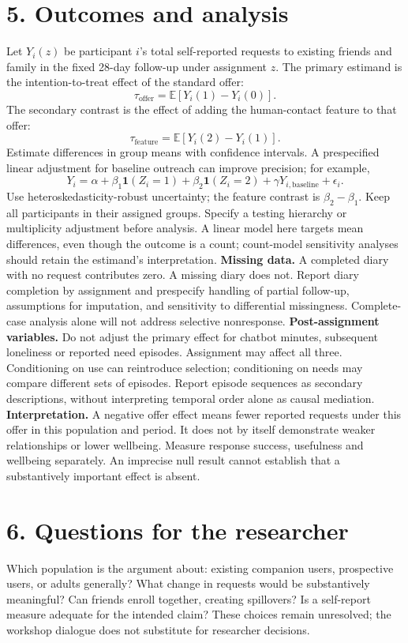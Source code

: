 \documentclass[11pt]{article}
\begin{document}
\section*{5. Outcomes and analysis}
Let $Y_i(z)$ be participant $i$'s total self-reported requests to existing friends and family in the fixed 28-day follow-up under assignment $z$. The primary estimand is the intention-to-treat effect of the standard offer:
\[
\tau_{\mathrm{offer}}=\mathbb{E}[Y_i(1)-Y_i(0)].
\]
The secondary contrast is the effect of adding the human-contact feature to that offer:
\[
\tau_{\mathrm{feature}}=\mathbb{E}[Y_i(2)-Y_i(1)].
\]
Estimate differences in group means with confidence intervals. A prespecified linear adjustment for baseline outreach can improve precision; for example,
\[
Y_i=\alpha+\beta_1\mathbf{1}(Z_i=1)+\beta_2\mathbf{1}(Z_i=2)+\gamma Y_{i,\mathrm{baseline}}+\epsilon_i.
\]
Use heteroskedasticity-robust uncertainty; the feature contrast is $\beta_2-\beta_1$. Keep all participants in their assigned groups. Specify a testing hierarchy or multiplicity adjustment before analysis. A linear model here targets mean differences, even though the outcome is a count; count-model sensitivity analyses should retain the estimand's interpretation.
\textbf{Missing data.} A completed diary with no request contributes zero. A missing diary does not. Report diary completion by assignment and prespecify handling of partial follow-up, assumptions for imputation, and sensitivity to differential missingness. Complete-case analysis alone will not address selective nonresponse.
\textbf{Post-assignment variables.} Do not adjust the primary effect for chatbot minutes, subsequent loneliness or reported need episodes. Assignment may affect all three. Conditioning on use can reintroduce selection; conditioning on needs may compare different sets of episodes. Report episode sequences as secondary descriptions, without interpreting temporal order alone as causal mediation.
\textbf{Interpretation.} A negative offer effect means fewer reported requests under this offer in this population and period. It does not by itself demonstrate weaker relationships or lower wellbeing. Measure response success, usefulness and wellbeing separately. An imprecise null result cannot establish that a substantively important effect is absent.
\section*{6. Questions for the researcher}
Which population is the argument about: existing companion users, prospective users, or adults generally? What change in requests would be substantively meaningful? Can friends enroll together, creating spillovers? Is a self-report measure adequate for the intended claim? These choices remain unresolved; the workshop dialogue does not substitute for researcher decisions.
\newpage
\end{document}
